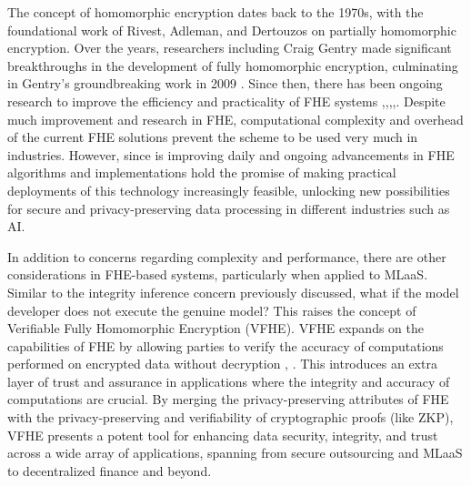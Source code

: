 \documentclass[conference]{IEEEtran}
\begin{document}
The concept of homomorphic encryption dates back to the 1970s, with the foundational work of Rivest, Adleman, and Dertouzos on partially homomorphic encryption. Over the years, researchers including Craig Gentry made significant breakthroughs in the development of fully homomorphic encryption, culminating in Gentry’s groundbreaking work in 2009 . Since then, there has been ongoing research to improve the efficiency and practicality of FHE systems ,,,,. Despite much improvement and research in FHE, computational complexity and overhead of the current FHE solutions prevent the scheme to be used very much in industries. However, since is improving daily and ongoing advancements in FHE algorithms and implementations hold the promise of making practical deployments of this technology increasingly feasible, unlocking new possibilities for secure and privacy-preserving data processing in different industries such as AI.

In addition to concerns regarding complexity and performance, there are other considerations in FHE-based systems, particularly when applied to MLaaS. Similar to the integrity inference concern previously discussed, what if the model developer does not execute the genuine model? This raises the concept of Verifiable Fully Homomorphic Encryption (VFHE). VFHE expands on the capabilities of FHE by allowing parties to verify the accuracy of computations performed on encrypted data without decryption , . This introduces an extra layer of trust and assurance in applications where the integrity and accuracy of computations are crucial. By merging the privacy-preserving attributes of FHE with the privacy-preserving and verifiability of cryptographic proofs (like ZKP), VFHE presents a potent tool for enhancing data security, integrity, and trust across a wide array of applications, spanning from secure outsourcing and MLaaS to decentralized finance and beyond.
\end{document}

